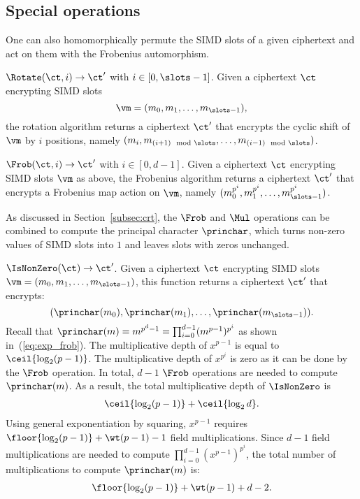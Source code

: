 \subsection{Special operations}\label{subsec:special_operations}

One can also homomorphically permute the SIMD slots of a given ciphertext and act on them with the Frobenius automorphism. 

$\Rotate(\ct, i) \rightarrow \ct'$ with $i \in [0, \slots-1]$. Given a ciphertext $\ct$ encrypting SIMD slots 
$$\vm = (m_0,m_1,\dots,m_{\slots-1}),$$
the rotation algorithm returns a ciphertext $\ct'$ that encrypts the cyclic shift of $\vm$ by $i$ positions, namely $(m_i,m_{(i+1) \mod \slots},\dots,m_{(i-1) \mod \slots})$.

$\Frob(\ct, i) \rightarrow \ct'$ with $i\in[0,d-1]$. Given a ciphertext $\ct$ encrypting SIMD slots $\vm$ as above, the Frobenius algorithm returns a ciphertext $\ct'$ that encrypts a Frobenius map action on $\vm$, namely $(m^{p^i}_0,m^{p^i}_1,\dots,m^{p^i}_{\slots-1})$.

As discussed in Section~\ref{subsec:crt}, the $\Frob$ and $\Mul$ operations can be combined to compute the principal character $\princhar$, which turns non-zero values of SIMD slots into $1$ and leaves slots with zeros unchanged.

$\IsNonZero(\ct) \rightarrow \ct'$. Given a ciphertext $\ct$ encrypting SIMD slots $\vm = (m_0,m_1,\dots,m_{\slots-1})$, this function returns a ciphertext $\ct'$ that encrypts:
\[
  (\princhar(m_0), \princhar(m_1), \dots, \princhar(m_{\slots-1})).
\]
Recall that $\princhar(m) = m^{p^d-1} = \prod_{i=0}^{d-1} (m^{p-1})^{p^i}$ as shown in~(\ref{eq:exp_frob}).
The multiplicative depth of $x^{p-1}$ is equal to $\ceil{\log_2 (p-1)}$.
The multiplicative depth of $x^{p^i}$ is zero as it can be done by the $\Frob$ operation.
In total, $d-1$ $\Frob$ operations are needed to compute $\princhar(m)$.
As a result, the total multiplicative depth of $\IsNonZero$ is
\begin{align}\label{eq:nonzero_depth}
  \ceil{\log_2 (p-1)} + \ceil{\log_2 d}.
\end{align}
Using general exponentiation by squaring, $x^{p-1}$ requires $\floor{\log_2 (p-1)} + \wt(p-1) - 1$ field multiplications.
Since $d-1$ field multiplications are needed to compute $\prod_{i=0}^{d-1} (x^{p-1})^{p^i}$, the total number of multiplications to compute $\princhar(m)$ is:
\begin{align}\label{eq:nonzero_width}
  \floor{\log_2 (p-1)} + \wt(p-1) + d - 2.
\end{align} 

